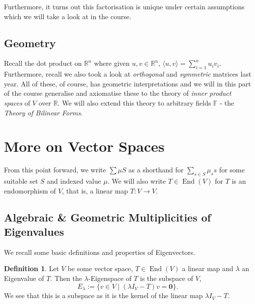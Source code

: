 \documentclass[
]{article}
\theoremstyle{definition}
\theoremstyle{definition}
\newtheorem{definition}{Definition}[section]
\begin{document}
Furthermore, it turns out this factorisation is unique under certain
assumptions which we will take a look at in the course.

\hypertarget{geometry}{%
\subsection{Geometry}\label{geometry}}

Recall the dot product on \(\mathbb{R}^n\) where given
\(u, v \in \mathbb{R}^n\),
\(\langle u, v \rangle = \sum_{i = 1}^n u_i v_i\). Furthermore, recall
we also took a look at \emph{orthogonal} and \emph{symmetric} matrices
last year. All of these, of course, has geometric interpretations and we
will in this part of the course generalise and axiomatise these to the
theory of \emph{inner product spaces} of \(V\) over \(\mathbb{R}\). We
will also extend this theory to arbitrary fields \(\mathbb{F}\) - the
\emph{Theory of Bilinear Forms}.

\newpage

\hypertarget{more-on-vector-spaces}{%
\section{More on Vector Spaces}\label{more-on-vector-spaces}}

From this point forward, we write \(\sum \mu S\) as a shorthand for
\(\sum_{s \in S} \mu_s s\) for some suitable set \(S\) and indexed value
\(\mu\). We will also write \(T \in \mathop{\mathrm{End}}(V)\) for \(T\)
is an endomorphism of \(V\), that is, a linear map \(T : V \to V\).

\hypertarget{algebraic-geometric-multiplicities-of-eigenvalues}{%
\subsection{Algebraic \& Geometric Multiplicities of
Eigenvalues}\label{algebraic-geometric-multiplicities-of-eigenvalues}}

We recall some basic definitions and properties of Eigenvectors.

\begin{definition}
  Let \(V\) be some vector space, \(T \in \mathop{\mathrm{End}}(V)\) a linear map and \(\lambda\) 
  an Eigenvalue of \(T\). Then the \(\lambda\)-Eigenspace of \(T\) is the 
  subspace of \(V\),
  \[E_\lambda := \{ v \in V \mid (\lambda I_V - T)v = \mathbf{0} \}.\]
  We see that this is a subspace as it is the kernel of the linear map 
  \(\lambda I_V - T\).
\end{definition}
\end{document}
